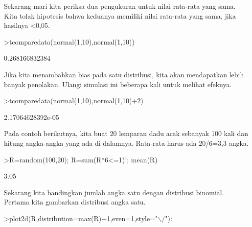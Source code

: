 \documentclass[a4paper,10pt]{article}
\begin{document}
\begin{eulernotebook}
\begin{eulercomment}
\begin{eulercomment}
\begin{eulercomment}
\begin{eulercomment}
\begin{eulercomment}
\begin{eulercomment}
\begin{eulercomment}
\begin{eulercomment}
\begin{eulercomment}
\begin{eulercomment}
\begin{eulercomment}
\begin{eulercomment}
\begin{eulercomment}
\begin{eulercomment}
\begin{eulercomment}
\begin{eulercomment}
\begin{eulercomment}
\begin{eulercomment}
\begin{eulercomment}
\begin{eulercomment}
\begin{eulercomment}
\begin{eulercomment}
\begin{eulercomment}
\begin{eulercomment}
\begin{eulercomment}
\begin{eulercomment}
\begin{eulercomment}
\begin{eulercomment}
\begin{eulercomment}
\begin{eulercomment}
\begin{eulercomment}
\begin{eulercomment}
\begin{eulercomment}
Sekarang mari kita periksa dua pengukuran untuk nilai rata-rata yang
sama. Kita tolak hipotesis bahwa keduanya memiliki nilai rata-rata
yang sama, jika hasilnya \textless{}0,05.
\end{eulercomment}
\begin{eulerprompt}
>tcomparedata(normal(1,10),normal(1,10))
\end{eulerprompt}
\begin{euleroutput}
  0.268166832384
\end{euleroutput}
\begin{eulercomment}
Jika kita menambahkan bias pada satu distribusi, kita akan mendapatkan
lebih banyak penolakan. Ulangi simulasi ini beberapa kali untuk
melihat efeknya.
\end{eulercomment}
\begin{eulerprompt}
>tcomparedata(normal(1,10),normal(1,10)+2)
\end{eulerprompt}
\begin{euleroutput}
  2.17064628392e-05
\end{euleroutput}
\begin{eulercomment}
Pada contoh berikutnya, kita buat 20 lemparan dadu acak sebanyak 100
kali dan hitung angka-angka yang ada di dalamnya. Rata-rata harus ada
20/6=3,3 angka.
\end{eulercomment}
\begin{eulerprompt}
>R=random(100,20); R=sum(R*6<=1)'; mean(R)
\end{eulerprompt}
\begin{euleroutput}
  3.05
\end{euleroutput}
\begin{eulercomment}
Sekarang kita bandingkan jumlah angka satu dengan distribusi binomial.
Pertama kita gambarkan distribusi angka satu.
\end{eulercomment}
\begin{eulerprompt}
>plot2d(R,distribution=max(R)+1,even=1,style="\(\backslash\)/"):

\end{eulerprompt}
\end{eulercomment}
\end{eulercomment}
\end{eulercomment}
\end{eulercomment}
\end{eulercomment}
\end{eulercomment}
\end{eulercomment}
\end{eulercomment}
\end{eulercomment}
\end{eulercomment}
\end{eulercomment}
\end{eulercomment}
\end{eulercomment}
\end{eulercomment}
\end{eulercomment}
\end{eulercomment}
\end{eulercomment}
\end{eulercomment}
\end{eulercomment}
\end{eulercomment}
\end{eulercomment}
\end{eulercomment}
\end{eulercomment}
\end{eulercomment}
\end{eulercomment}
\end{eulercomment}
\end{eulercomment}
\end{eulercomment}
\end{eulercomment}
\end{eulercomment}
\end{eulercomment}
\end{eulercomment}
\end{eulernotebook}
\end{document}
